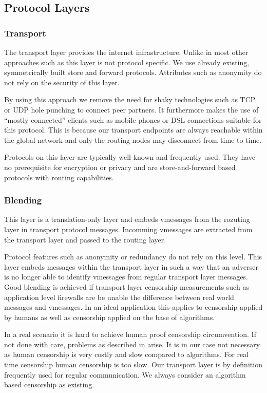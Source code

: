 \documentclass[9pt,journal,compsoc]{IEEEtran}
\begin{document}
\subsection{Protocol Layers}
\subsubsection{Transport}
The transport layer provides the internet infrastructure. Unlike in most other approaches such as \cite{tor-design,sherwood2005p5,freenet} this layer is not protocol specific. We use already existing, symmetrically built store and forward protocols. Attributes such as anonymity do not rely on the security of this layer.

By using this approach we remove the need for shaky technologies such as TCP or UDP hole punching to connect peer partners. It furthermore makes the use of ``mostly connected'' clients such as mobile phones or DSL connections suitable for this protocol. This is because our transport endpoints are always reachable within the global network and only the routing nodes may disconnect from time to time. 

Protocols on this layer are typically well known and frequently used. They have no prerequisite for encryption or privacy and are store-and-forward based protocols with routing capabilities. 

\subsubsection{Blending}
This layer is a translation-only layer and embeds vmessages from the rozuting layer in transport protocol messages. Incomming vmessages are extracted from the transport layer and passed to the routing layer. 

Protocol features such as anonymity or redundancy do not rely on this level. This layer embeds messages within the transport layer in such a way that an adverser is no longer able to identify vmessages from regular transport layer messages. Good blending is achieved if transport layer censorship measurements such as application level firewalls are be unable the difference between real world messages and vmessages. In an ideal application this applies to censorship applied by humans as well as censorship applied on the base of algorithms. 

In a real scenario it is hard to achieve human proof censorship circumvention. If not done with care, problems as described in \cite{abadi2005moderately} arise. It is in our case not necessary as human censorship is very costly and slow compared to algorithms. For real time censorship human censorship is too slow. Our transport layer is by definition frequently used for regular communication. We always consider an algorithm based censorship as existing.
\end{document}
